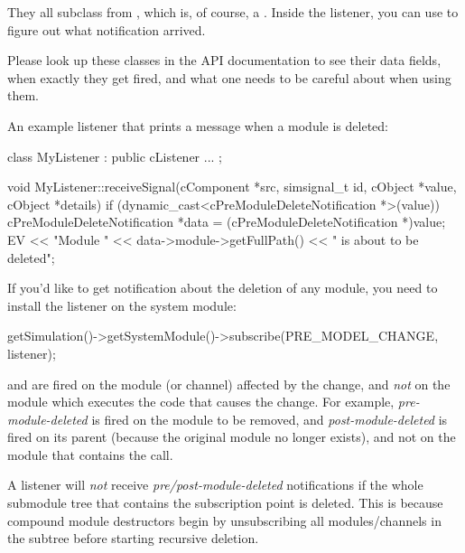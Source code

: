 They all subclass from , which is, of course, a
. Inside the listener, you can use  to figure
out what notification arrived.

\begin{note}
  Please look up these classes in the API documentation to see their data fields,
  when exactly they get fired, and what one needs to be careful about when using them.
\end{note}

An example listener that prints a message when a module is deleted:

\begin{cpp}
class MyListener : public cListener
{
   ...
};

void MyListener::receiveSignal(cComponent *src, simsignal_t id, cObject *value,
                               cObject *details)
{
    if (dynamic_cast<cPreModuleDeleteNotification *>(value)) {
        cPreModuleDeleteNotification *data = (cPreModuleDeleteNotification *)value;
        EV << "Module " << data->module->getFullPath() << " is about to be deleted\n";
    }
}
\end{cpp}

If you'd like to get notification about the deletion of any module, you need
to install the listener on the system module:

\begin{cpp}
getSimulation()->getSystemModule()->subscribe(PRE_MODEL_CHANGE, listener);
\end{cpp}

\begin{note}
   and  are fired on the
  module (or channel) affected by the change, and \textit{not} on the module
  which executes the code that causes the change. For example,
  \textit{pre-module-deleted} is fired on the module to be removed, and
  \textit{post-module-deleted} is fired on its parent (because the original
  module no longer exists), and not on the module that contains the
   call.
\end{note}

\begin{note}
  A listener will \textit{not} receive \textit{pre/post-module-deleted}
  notifications if the whole submodule tree that contains the subscription
  point is deleted. This is because compound module destructors begin
  by unsubscribing all modules/channels in the subtree before starting
  recursive deletion.
\end{note}


